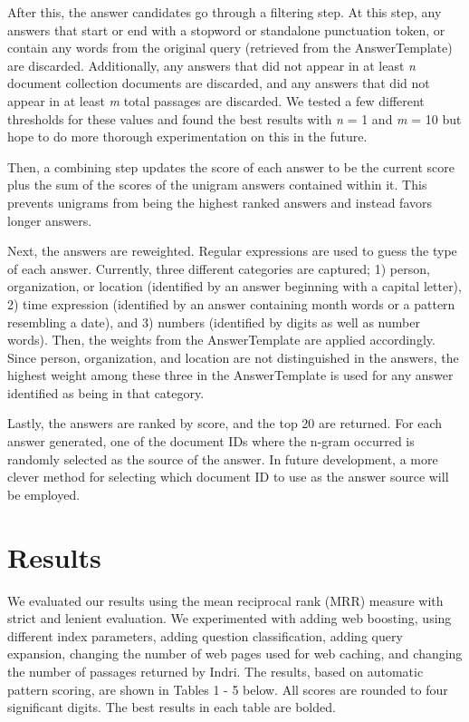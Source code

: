 \documentclass[11pt]{article}
\begin{document}
After this, the answer candidates go through a filtering step.  At this step, any answers that start or end with a stopword or standalone punctuation token, or contain any words from the original query (retrieved from the AnswerTemplate) are discarded.  Additionally, any answers that did not appear in at least \emph{n} document collection documents are discarded, and any answers that did not appear in at least \emph{m} total passages are discarded.  We tested a few different thresholds for these values and found the best results with \emph{n} = 1 and \emph{m} = 10 but hope to do more thorough experimentation on this in the future.

Then, a combining step updates the score of each answer to be the current score plus the sum of the scores of the unigram answers contained within it. This prevents unigrams from being the highest ranked answers and instead favors longer answers.

Next, the answers are reweighted.  Regular expressions are used to guess the type of each answer.  Currently, three different categories are captured; 1) person, organization, or location (identified by an answer beginning with a capital letter), 2) time expression (identified by an answer containing month words or a pattern resembling a date), and 3) numbers (identified by digits as well as number words).  Then, the weights from the AnswerTemplate are applied accordingly.  Since person, organization, and location are not distinguished in the answers, the highest weight among these three in the AnswerTemplate is used for any answer identified as being in that category.

Lastly, the answers are ranked by score, and the top 20 are returned.  For each answer generated, one of the document IDs where the n-gram occurred is randomly selected as the source of the answer.  In future development, a more clever method for selecting which document ID to use as the answer source will be employed.

\section{Results}

We evaluated our results using the mean reciprocal rank (MRR) measure with strict and lenient evaluation. We experimented with adding web boosting, using different index parameters, adding question classification, adding query expansion, changing the number of web pages used for web caching, and changing the number of passages returned by Indri.  The results, based on automatic pattern scoring, are shown in Tables 1 - 5 below.  All scores are rounded to four significant digits.  The best results in each table are bolded.
\end{document}

